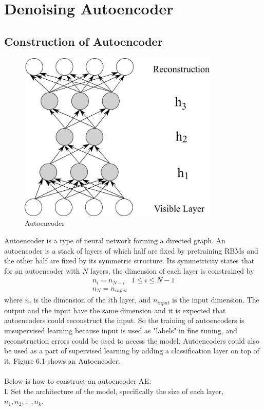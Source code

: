 \documentclass[12pt]{article}
\begin{document}
\section{Denoising Autoencoder}
\subsection{Construction of Autoencoder}
\begin{figure}[h]
\centering
\includegraphics[height=3.2in]{AE.png}
\caption{Autoencoder} \label{fig:side:a}
\end{figure}
Autoencoder is a type of neural network forming  a directed graph. An autoencoder is a stack of layers of which half are fixed by pretraining RBMs and the other half are fixed by its symmetric structure. Its symmetricity states that for an autoencoder with $N$ layers, the dimension of each layer is constrained by \begin{gather}
n_i = n_{N - i}~~~~1\leq i\leq N-1\\
n_{N} = n_{input}
\end{gather}
where $n_i$ is the dimension of the $i$th layer, and $n_{input}$ is the input dimension. The output and the input have the same dimension and it is expected that autoencoders could reconstruct the input. So the training of autoencoders is unsupervised learning because input is used as "labels" in fine tuning, and reconstruction errors could be used to access the model. Autoencoders could also be used as a part of supervised learning by adding a classification layer on top of it. Figure 6.1 shows an Autoencoder.\\
\\
Below is how to construct an autoencoder AE:\\
I. Set the architecture of the model, specifically the size of each layer, \(n_1, n_2, ..., n_k\).\\
\end{document}

